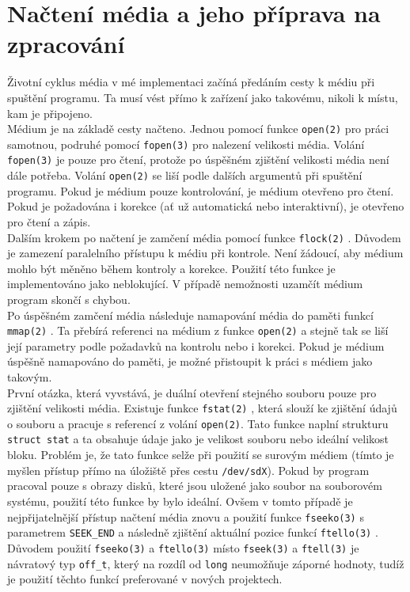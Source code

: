 \section{Načtení média a jeho příprava na zpracování}
Životní cyklus média v mé implementaci začíná předáním cesty k médiu při spuštění programu. Ta musí vést přímo k zařízení jako takovému, nikoli k místu, kam je připojeno.\\
Médium je na základě cesty načteno. Jednou pomocí funkce \texttt{open(2)} \cite{man-open} pro práci samotnou, podruhé pomocí \texttt{fopen(3)} \cite{man-fopen} pro nalezení velikosti média. Volání \texttt{fopen(3)} je pouze pro čtení, protože po úspěšném zjištění velikosti média není dále potřeba. Volání \texttt{open(2)} se liší podle dalších argumentů při spuštění programu. Pokud je médium pouze kontrolování, je médium otevřeno pro čtení. Pokud je požadována i korekce (ať už automatická nebo interaktivní), je otevřeno pro čtení a zápis.\\
Dalším krokem po načtení je zamčení média pomocí funkce \texttt{flock(2)} \cite{man-flock}. Důvodem je zamezení paralelního přístupu k médiu při kontrole. Není žádoucí, aby médium mohlo být měněno během kontroly a korekce. Použití této funkce je implementováno jako neblokující. V případě nemožnosti uzamčít médium program skončí s chybou.\\
Po úspěšném zamčení média následuje namapování média do paměti funkcí \texttt{mmap(2)} \cite{man-mmap}. Ta přebírá referenci na médium z funkce \texttt{open(2)} a stejně tak se liší její parametry podle požadavků na kontrolu nebo i korekci. Pokud je médium úspěšně namapováno do paměti, je možné přistoupit k práci s médiem jako takovým.\\
První otázka, která vyvstává, je duální otevření stejného souboru pouze pro zjištění velikosti média. Existuje funkce \texttt{fstat(2)} \cite{man-fstat}, která slouží ke zjištění údajů o souboru a pracuje s referencí z volání \texttt{open(2)}. Tato funkce naplní strukturu \texttt{struct stat} a ta obsahuje údaje jako je velikost souboru nebo ideální velikost bloku. Problém je, že tato funkce selže při použití se surovým médiem (tímto je myšlen přístup přímo na úložiště přes cestu \texttt{/dev/sdX}). Pokud by program pracoval pouze s obrazy disků, které jsou uložené jako soubor na souborovém systému, použití této funkce by bylo ideální. Ovšem v tomto případě je nejpřijatelnější přístup načtení média znovu a použití funkce \texttt{fseeko(3)} \cite{man-fseeko} s parametrem \texttt{SEEK\_END} a následně zjištění aktuální pozice funkcí \texttt{ftello(3)} \cite{man-ftello}. Důvodem použití \texttt{fseeko(3)} a \texttt{ftello(3)} místo \texttt{fseek(3)} \cite{man-fseek} a \texttt{ftell(3)} \cite{man-ftell} je návratový typ \texttt{off\_t}, který na rozdíl od \texttt{long} neumožňuje záporné hodnoty, tudíž je použití těchto funkcí preferované v nových projektech.\\
